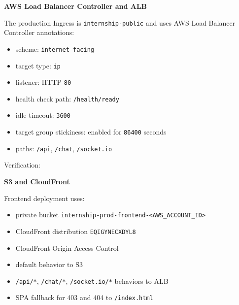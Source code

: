 \vspace{0.5em}\noindent\textbf{AWS Load Balancer Controller and
ALB}\par

The production Ingress is \texttt{internship-\allowbreak{}public} and uses AWS Load
Balancer Controller annotations:

\begin{itemize}
\tightlist
\item
  scheme: \texttt{internet-\allowbreak{}facing}
\item
  target type: \texttt{ip}
\item
  listener: HTTP \texttt{80}
\item
  health check path: \texttt{/\allowbreak{}health/\allowbreak{}ready}
\item
  idle timeout: \texttt{3600}
\item
  target group stickiness: enabled for \texttt{86400} seconds
\item
  paths: \texttt{/\allowbreak{}api}, \texttt{/\allowbreak{}chat}, \texttt{/\allowbreak{}socket.\allowbreak{}io}
\end{itemize}

Verification:

\begin{Shaded}
\begin{Highlighting}[]
\end{Highlighting}
\end{Shaded}

\vspace{0.5em}\noindent\textbf{S3 and CloudFront}\par

Frontend deployment uses:

\begin{itemize}
\tightlist
\item
  private bucket
  \texttt{internship-\allowbreak{}prod-\allowbreak{}frontend-\textless{}AWS\_\allowbreak{}ACCOUNT\_\allowbreak{}ID\textgreater{}}
\item
  CloudFront distribution \texttt{EQIGYNECXDYL8}
\item
  CloudFront Origin Access Control
\item
  default behavior to S3
\item
  \texttt{/\allowbreak{}api/\allowbreak{}*}, \texttt{/\allowbreak{}chat/\allowbreak{}*}, \texttt{/\allowbreak{}socket.\allowbreak{}io/\allowbreak{}*} behaviors to
  ALB
\item
  SPA fallback for 403 and 404 to \texttt{/\allowbreak{}index.\allowbreak{}html}
\end{itemize}


